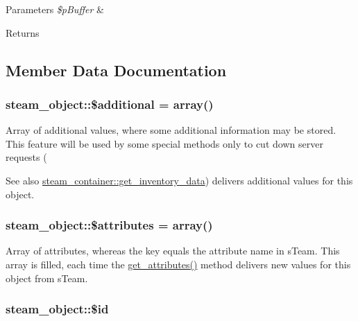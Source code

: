 \begin{DoxyParams}{Parameters}
{\em \$pBuffer} & \\
\hline
\end{DoxyParams}
\begin{DoxyReturn}{Returns}

\end{DoxyReturn}


\subsection{Member Data Documentation}
\hypertarget{classsteam__object_a2fddf4f894d012367ffdfc3e7fab34a7}{
\subsubsection[{\$additional}]{\setlength{\rightskip}{0pt plus 5cm}steam\_\-object::\$additional = array()}}
\label{classsteam__object_a2fddf4f894d012367ffdfc3e7fab34a7}
Array of additional values, where some additional information may be stored. This feature will be used by some special methods only to cut down server requests (\begin{DoxySeeAlso}{See also}
\hyperlink{classsteam__container_afa3178d396500f4c0078c68834e5dc66}{steam\_\-container::get\_\-inventory\_\-data}) delivers additional values for this object. 
\end{DoxySeeAlso}
\hypertarget{classsteam__object_ab8e4bfb9bf0ce92e7cc96f6392e6bb63}{
\subsubsection[{\$attributes}]{\setlength{\rightskip}{0pt plus 5cm}steam\_\-object::\$attributes = array()}}
\label{classsteam__object_ab8e4bfb9bf0ce92e7cc96f6392e6bb63}
Array of attributes, whereas the key equals the attribute name in sTeam. This array is filled, each time the \hyperlink{classsteam__object_ade749eb10db9e93fd48cc0b184daa4b9}{get\_\-attributes()} method delivers new values for this object from sTeam. \hypertarget{classsteam__object_ae727592524230da242a2a30cfe8fe4e2}{
\subsubsection[{\$id}]{\setlength{\rightskip}{0pt plus 5cm}steam\_\-object::\$id}}
